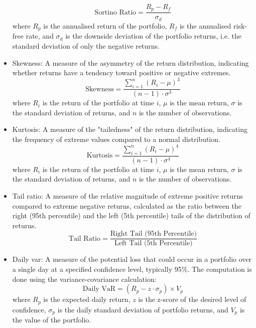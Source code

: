 \begin{itemize}
    \begin{equation}
        \text{Sortino Ratio} = \frac{R_p - R_f}{\sigma_d}
    \end{equation}
    where \(R_p\) is the annualised return of the portfolio, \(R_f\) is the annualised risk-free rate, and \(\sigma_d\) is the downside deviation of the portfolio returns, i.e. the standard deviation of only the negative returns.
    \item Skewness: A measure of the asymmetry of the return distribution, indicating whether returns have a tendency toward positive or negative extremes.
    \begin{equation}
        \text{Skewness} = \frac{\sum_{i=1}^{n} (R_i - \mu)^3}{(n-1) \cdot \sigma^3}
    \end{equation}
    where $R_i$ is the return of the portfolio at time $i$, $\mu$ is the mean return, $\sigma$ is the standard deviation of returns, and $n$ is the number of observations.
    \item Kurtosis: A measure of the "tailedness" of the return distribution, indicating the frequency of extreme values compared to a normal distribution. 
    \begin{equation}
        \text{Kurtosis} = \frac{\sum_{i=1}^{n} (R_i - \mu)^4}{(n-1) \cdot \sigma^4}
    \end{equation}
    where $R_i$ is the return of the portfolio at time $i$, $\mu$ is the mean return, $\sigma$ is the standard deviation of returns, and $n$ is the number of observations.
    \item Tail ratio: A measure of the relative magnitude of extreme positive returns compared to extreme negative returns, calculated as the ratio between the right (95th percentile) and the left (5th percentile) tails of the distribution of returns. 
    \begin{equation}
        \text{Tail Ratio} = \frac{\text{Right Tail (95th Percentile)}}{\text{Left Tail (5th Percentile)}}
    \end{equation}
    \item Daily \acrfull{var}: A measure of the potential loss that could occur in a portfolio over a single day at a specified confidence level, typically 95\%. The computation is done using the variance-covariance calculation:
    \begin{equation}
        \text{Daily VaR} = \left(R_p - z \cdot \sigma_p \right) \times V_p
    \end{equation}
    where $R_p$ is the expected daily return, $z$ is the z-score of the desired level of confidence, $\sigma_p$ is the daily standard deviation of portfolio returns, and $V_p$ is the value of the portfolio.
\end{itemize}